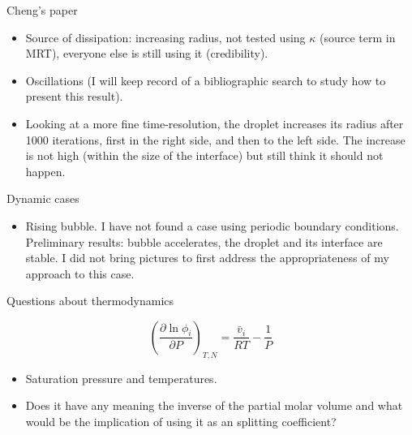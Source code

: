 \documentclass[8pt]{beamer}
\begin{document}
	\begin{frame}{Cheng's paper}
		\begin{itemize}
			\item Source of dissipation: increasing radius, not tested using $\kappa$ (source term in MRT),  everyone else is still using it (credibility).
			\item Oscillations (I will keep record of a bibliographic search to study how to present this result).
			\item Looking at a more fine time-resolution, the droplet increases its radius after 1000 iterations, first in the right side, and then to the left side. The increase is not high (within the size of the interface) but still think it should not happen. 

			
		\end{itemize}
	\end{frame}

	\begin{frame}{Dynamic cases}
		\begin{itemize}
			\item Rising bubble. I have not found a case using periodic boundary conditions. Preliminary results: bubble accelerates, the droplet and its interface are stable. I did not bring pictures to first address the appropriateness of my approach to this case.
			
		\end{itemize}
	\end{frame}

	\begin{frame}{Questions about thermodynamics}
		
		\begin{equation*}
		\left(\frac{\partial \ln \phi_i}{\partial P}\right)_{T,N} = \frac{\bar{v}_i}{RT} - \frac{1}{P}
		\end{equation*}
		
		\begin{itemize}
			\item Saturation pressure and temperatures.	
			\item Does it have any meaning the inverse of the partial molar volume and what would be the implication of using it as an splitting coefficient?
		\end{itemize}
	\end{frame}
\end{document}
